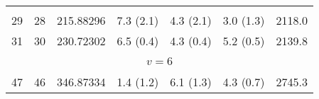 \begin{table*}[htp]
\begin{tabular}{ccccccc}
\vspace{-0.75em}\\
 29 & 28 & 215.88296 & 7.3 (2.1) & 4.3 (2.1) & 3.0 (1.3) & 2118.0 \\
 31 & 30 & 230.72302 & 6.5 (0.4) & 4.3 (0.4) & 5.2 (0.5) & 2139.8 \\
&\vspace{-0.75em}\\
\multicolumn{7}{c}{$v = 6$} \\
\vspace{-0.75em}\\
 47 & 46 & 346.87334 & 1.4 (1.2) & 6.1 (1.3) & 4.3 (0.7) & 2745.3 \\
\hline
\end{tabular}

\par 
\end{table*}
